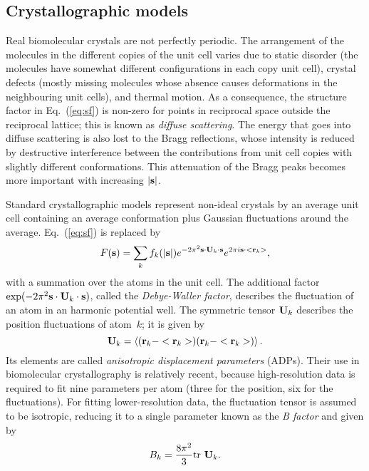 \documentclass[11pt]{article}
\newcommand{\vect}[1]{{\bf #1}}
\newcommand{\mat}[1]{{\bf #1}}
\newcommand{\vr}{\vect{r}}
\newcommand{\vs}{\vect{s}}
\newcommand{\mU}{\mat{U}}
\begin{document}
\begin{sloppy}
\subsection{Crystallographic models}

Real biomolecular crystals are not perfectly periodic. The arrangement
of the molecules in the different copies of the unit cell varies due
to static disorder (the molecules have somewhat different
configurations in each copy unit cell), crystal defects (mostly
missing molecules whose absence causes deformations in the
neighbouring unit cells), and thermal motion. As a consequence, the
structure factor in Eq.~(\ref{eq:sf}) is non-zero for points in
reciprocal space outside the reciprocal lattice; this is known as
\textit{diffuse scattering}. The energy that goes into diffuse
scattering is also lost to the Bragg reflections, whose intensity is
reduced by destructive interference between the contributions from
unit cell copies with slightly different conformations. This
attenuation of the Bragg peaks becomes more important with increasing
$|\vs|$.

Standard crystallographic models represent non-ideal crystals by an
average unit cell containing an average conformation plus Gaussian
fluctuations around the average. Eq.~(\ref{eq:sf}) is replaced by
\begin{equation}
\label{eq:model_sf}
F(\vs) = \sum_k f_k(|\vs|) e^{-2\pi^2 \vs\cdot\mU_k\cdot\vs} e^{2\pi i\vs\cdot<\vr_k>},
\end{equation}
with a summation over the atoms in the unit cell.
The additional factor $\exp(-2\pi^2 \vs\cdot\mU_k\cdot\vs)$,
called the \textit{Debye-Waller factor}, describes the fluctuation
of an atom in an harmonic potential well. The symmetric tensor $\mU_k$
describes the position fluctuations of atom~$k$; it is given by
\begin{equation}
\mU_k = \left<  (\vr_k-<\vr_k>) (\vr_k-<\vr_k>) \right>.
\end{equation}
Its elements are called \textit{anisotropic displacement parameters}
(ADPs). Their use in biomolecular crystallography is relatively
recent, because high-resolution data is required to fit nine
parameters per atom (three for the position, six for the
fluctuations). For fitting lower-resolution data, the fluctuation
tensor is assumed to be isotropic, reducing it to a single parameter
known as the \textit{B factor} and given by
\begin{equation}
B_k = \frac{8\pi^2}{3} \mbox{tr } \mU_k.
\end{equation}


\end{sloppy}
\end{document}
